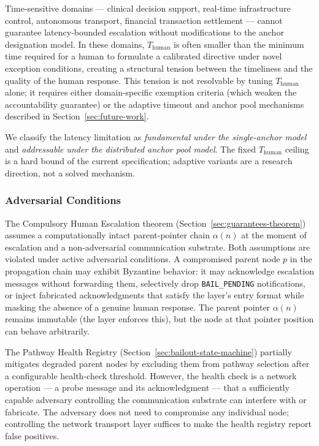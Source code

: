 Time-sensitive domains --- clinical decision support, real-time infrastructure control, autonomous transport, financial transaction settlement --- cannot guarantee latency-bounded escalation without modifications to the anchor designation model. In these domains, $T_{\text{human}}$ is often smaller than the minimum time required for a human to formulate a calibrated directive under novel exception conditions, creating a structural tension between the timeliness and the quality of the human response. This tension is not resolvable by tuning $T_{\text{human}}$ alone; it requires either domain-specific exemption criteria (which weaken the accountability guarantee) or the adaptive timeout and anchor pool mechanisms described in Section~\ref{sec:future-work}.

We classify the latency limitation as \emph{fundamental under the single-anchor model} and \emph{addressable under the distributed anchor pool model}. The fixed $T_{\text{human}}$ ceiling is a hard bound of the current specification; adaptive variants are a research direction, not a solved mechanism.

\subsubsection{Adversarial Conditions}
\label{sec:lim:adversarial}

The Compulsory Human Escalation theorem (Section~\ref{sec:guarantees-theorem}) assumes a computationally intact parent-pointer chain $\alpha(n)$ at the moment of escalation and a non-adversarial communication substrate. Both assumptions are violated under active adversarial conditions. A compromised parent node $p$ in the propagation chain may exhibit Byzantine behavior: it may acknowledge escalation messages without forwarding them, selectively drop \texttt{BAIL\_PENDING} notifications, or inject fabricated acknowledgments that satisfy the \fact{} layer's entry format while masking the absence of a genuine human response. The parent pointer $\alpha(n)$ remains immutable (the \fact{} layer enforces this), but the node at that pointer position can behave arbitrarily.

The Pathway Health Registry (Section~\ref{sec:bailout-state-machine}) partially mitigates degraded parent nodes by excluding them from pathway selection after a configurable health-check threshold. However, the health check is a network operation --- a probe message and its acknowledgment --- that a sufficiently capable adversary controlling the communication substrate can interfere with or fabricate. The adversary does not need to compromise any individual node; controlling the network transport layer suffices to make the health registry report false positives.

